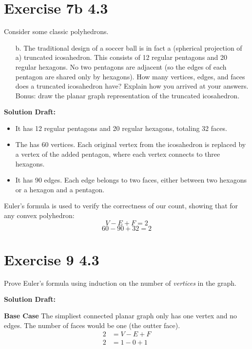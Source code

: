 \documentclass{article}
\begin{document}
\section*{Exercise 7b 4.3}  

Consider some classic polyhedrons.%
\begin{enumerate}
\item[b.] The traditional design of a soccer ball is in fact a (spherical projection of a) truncated icosahedron. This consists of 12 regular pentagons and 20 regular hexagons. No two pentagons are adjacent (so the edges of each pentagon are shared only by hexagons). How many vertices, edges, and faces does a truncated icosahedron have? Explain how you arrived at your answers. Bonus: draw the planar graph representation of the truncated icosahedron.%
\end{enumerate}

\vspace{0.5cm}
\noindent\textbf{Solution Draft:} 
\vspace{0.2cm}

\begin{itemize}
    \item  It has 12 regular pentagons and 20 regular hexagons, totaling 32 faces.
    \item  The has 60 vertices. Each original vertex from the icosahedron is replaced by a vertex of the added pentagon, where each vertex connects to three hexagons.
    \item  It has 90 edges. Each edge belongs to two faces, either between two hexagons or a hexagon and a pentagon.
\end{itemize}

Euler's formula is used to verify the correctness of our count, showing that for any convex polyhedron:
\[
V - E + F = 2
\]
\[
60 - 90 + 32 = 2
\]


\section*{Exercise 9 4.3}  

Prove Euler's formula using induction on the number of \emph{vertices} in the graph.

\vspace{0.5cm}
\noindent\textbf{Solution Draft:} 
\vspace{0.2cm}

\textbf{Base Case}
The simpliest connected planar graph only has one vertex and no edges. The number of faces would be one (the outter face).
\begin{align*}
2 &= V-E+F \\
2 &= 1-0+1
\end{align*}
\end{document}
